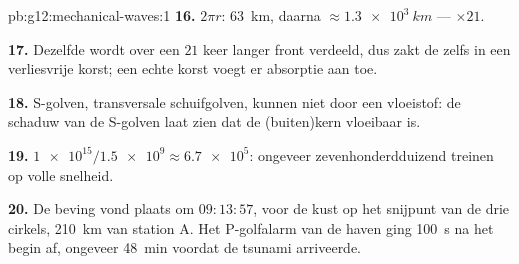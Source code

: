\begin{solution}{pb:g12:mechanical-waves:1}
\textbf{16.} $2\pi r$: \qty{63}{km}, daarna $\approx \qty{1.3e3}{km}$ ---
$\times 21$.

\textbf{17.} Dezelfde  wordt over een $21$ keer langer front
verdeeld, dus zakt de  zelfs in een verliesvrije korst; een
echte korst voegt er absorptie aan toe.

\textbf{18.} S-golven, transversale schuifgolven, kunnen niet door een
vloeistof: de schaduw van de S-golven laat zien dat de (buiten)kern
vloeibaar is.

\textbf{19.} $\num{1e15}/\num{1.5e9} \approx \num{6.7e5}$: ongeveer
zevenhonderdduizend treinen op volle snelheid.

\textbf{20.} De beving vond plaats om $09{:}13{:}57$, voor de kust op het
snijpunt van de drie cirkels, \qty{210}{km} van station A. Het
P-golfalarm van de haven ging \qty{100}{s} na het begin af, ongeveer
\qty{48}{min} voordat de tsunami arriveerde.
\end{solution}
